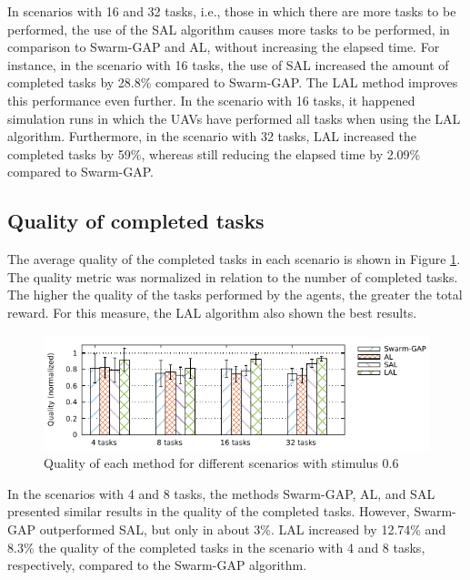 In scenarios with 16 and 32 tasks, i.e., those in which there are more tasks to be performed, the use of the SAL algorithm causes more tasks to be performed, in comparison to Swarm-GAP and AL, without increasing the elapsed time. For instance, in the scenario with 16 tasks, the use of SAL increased the amount of completed tasks by 28.8\% compared to Swarm-GAP. The LAL method improves this performance even further. 
In the scenario with 16 tasks, it happened simulation runs in which the UAVs have performed all tasks when using the LAL algorithm. Furthermore, in the scenario with 32 tasks, LAL increased the completed tasks by 59\%, whereas still reducing the elapsed time by 2.09\% compared to Swarm-GAP.

\subsection{Quality of completed tasks}

The average quality of the completed tasks in each scenario is shown in Figure \ref{grafico:qualidade}. The quality metric was normalized in relation to the number of completed tasks. The higher the quality of the tasks performed by the agents, the greater the total reward. For this measure, the LAL algorithm also shown the best results.

%
\begin{figure}[h!]
	\begin{center}
		\includegraphics[scale=1.00]{quality.pdf}
		\caption{Quality of each method for different scenarios with stimulus 0.6}
		\label{grafico:qualidade}
	\end{center}
\end{figure}

In the scenarios with 4 and 8 tasks, the methods Swarm-GAP, AL, and SAL presented similar results in the quality of the completed tasks. However, Swarm-GAP outperformed SAL, but only in about 3\%. LAL increased by 12.74\% and 8.3\% the quality of the completed tasks in the scenario with 4 and 8 tasks, respectively, compared to the Swarm-GAP algorithm. 

